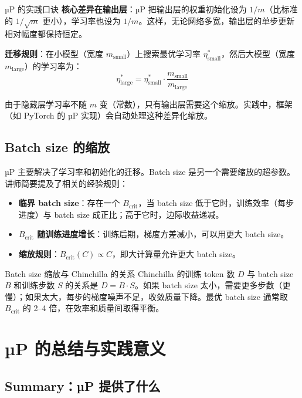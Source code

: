 \documentclass[a4paper]{article}
\begin{document}
\vspace{0.3cm}

\begin{importantbox}{µP 的实践口诀}
\textbf{核心差异在输出层}：µP 把输出层的权重初始化设为 $1/m$（比标准的 $1/\sqrt{m}$ 更小），学习率也设为 $1/m$。这样，无论网络多宽，输出层的单步更新相对幅度都保持恒定。

\textbf{迁移规则}：在小模型（宽度 $m_{\text{small}}$）上搜索最优学习率 $\eta^*_{\text{small}}$，然后大模型（宽度 $m_{\text{large}}$）的学习率为：
\[
\eta^*_{\text{large}} = \eta^*_{\text{small}} \cdot \frac{m_{\text{small}}}{m_{\text{large}}}
\]

由于隐藏层学习率不随 $m$ 变（常数），只有输出层需要这个缩放。实践中，框架（如 PyTorch 的 µP 实现）会自动处理这种差异化缩放。
\end{importantbox}

\subsection{Batch size 的缩放}

µP 主要解决了学习率和初始化的迁移。Batch size 是另一个需要缩放的超参数。讲师简要提及了相关的经验规则：

\begin{itemize}
\item \textbf{临界 batch size}：存在一个 $B_{\text{crit}}$，当 batch size 低于它时，训练效率（每步进度）与 batch size 成正比；高于它时，边际收益递减。
\item \textbf{$B_{\text{crit}}$ 随训练进度增长}：训练后期，梯度方差减小，可以用更大 batch size。
\item \textbf{缩放规则}：$B_{\text{crit}}(C) \propto C$，即大计算量允许更大 batch size。
\end{itemize}

\begin{knowledgebox}{Batch size 缩放与 Chinchilla 的关系}
Chinchilla 的训练 token 数 $D$ 与 batch size $B$ 和训练步数 $S$ 的关系是 $D = B \cdot S$。如果 batch size 太小，需要更多步数（更慢）；如果太大，每步的梯度噪声不足，收敛质量下降。最优 batch size 通常取 $B_{\text{crit}}$ 的 2--4 倍，在效率和质量间取得平衡。
\end{knowledgebox}

\section{µP 的总结与实践意义}

\subsection{Summary：µP 提供了什么}
\end{document}
